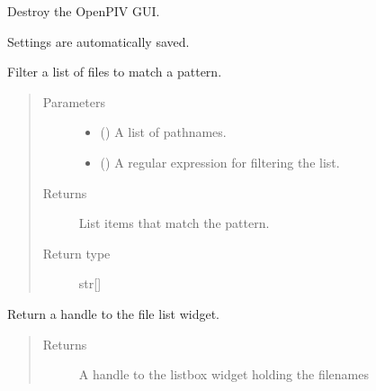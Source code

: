 \documentclass[letterpaper,10pt,english]{sphinxmanual}
\begin{document}
\begin{fulllineitems}
\begin{fulllineitems}
\label{\detokenize{openpivgui:openpivgui.OpenPivGui.OpenPivGui.destroy}}
Destroy the OpenPIV GUI.

Settings are automatically saved.

\end{fulllineitems}


\begin{fulllineitems}
\label{\detokenize{openpivgui:openpivgui.OpenPivGui.OpenPivGui.file_filter}}
Filter a list of files to  match a pattern.
\begin{quote}\begin{description}
\item[{Parameters}] \leavevmode\begin{itemize}
\item {} 
 (\sphinxstyleliteralemphasis{\sphinxupquote{{[}}}\sphinxstyleliteralemphasis{\sphinxupquote{{]}}}) \textendash{} A list of pathnames.

\item {} 
 () \textendash{} A regular expression for filtering the list.

\end{itemize}

\item[{Returns}] \leavevmode
List items that match the pattern.

\item[{Return type}] \leavevmode
str{[}{]}

\end{description}\end{quote}

\end{fulllineitems}


\begin{fulllineitems}
\label{\detokenize{openpivgui:openpivgui.OpenPivGui.OpenPivGui.get_filelistbox}}
Return a handle to the file list widget.
\begin{quote}\begin{description}
\item[{Returns}] \leavevmode
A handle to the listbox widget holding the filenames


\end{description}
\end{quote}
\end{fulllineitems}
\end{fulllineitems}
\end{document}
